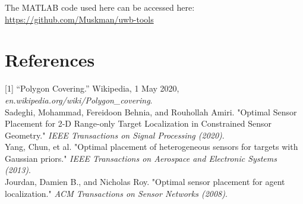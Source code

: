 \documentclass{article}
\begin{document}
\noindent The MATLAB code used here can be accessed here: \href{https://github.com/Muskman/uwb-tools}{https://github.com/Muskman/uwb-tools}

\section*{References}

[1] “Polygon Covering.” Wikipedia,  1 May 2020, \textit{en.wikipedia.org/wiki/Polygon\_covering}. \\

\noindent[2] Sadeghi, Mohammad, Fereidoon Behnia, and Rouhollah Amiri. "Optimal Sensor Placement for 2-D Range-only Target Localization in Constrained Sensor Geometry." \textit{IEEE Transactions on Signal Processing (2020)}. \\

\noindent[3] Yang, Chun, et al. "Optimal placement of heterogeneous sensors for targets with Gaussian priors." \textit{IEEE Transactions on Aerospace and Electronic Systems (2013)}. \\

\noindent[4] Jourdan, Damien B., and Nicholas Roy. "Optimal sensor placement for agent localization." \textit{ACM Transactions on Sensor Networks (2008)}.
\end{document}
